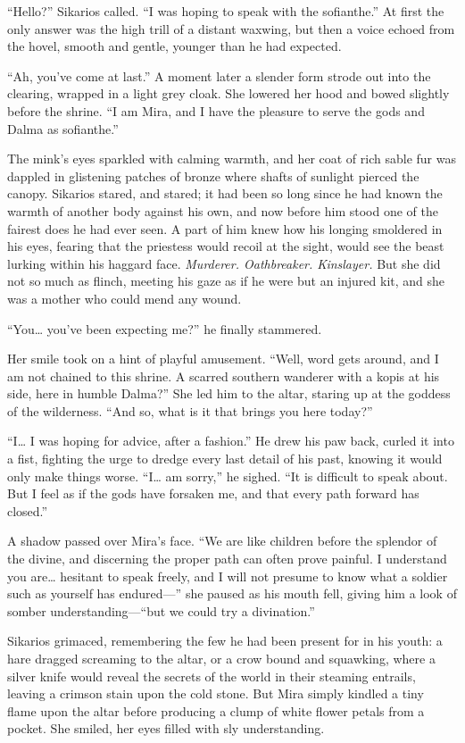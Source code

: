 ``Hello?'' Sikarios called. ``I was hoping to speak with the sofianthe.'' At first the only answer was the high trill of a distant waxwing, but then a voice echoed from the hovel, smooth and gentle, younger than he had expected.

``Ah, you've come at last.'' A moment later a slender form strode out into the clearing, wrapped in a light grey cloak. She lowered her hood and bowed slightly before the shrine. ``I am Mira, and I have the pleasure to serve the gods and Dalma as sofianthe.''

The mink's eyes sparkled with calming warmth, and her coat of rich sable fur was dappled in glistening patches of bronze where shafts of sunlight pierced the canopy. Sikarios stared, and stared; it had been so long since he had known the warmth of another body against his own, and now before him stood one of the fairest does he had ever seen. A part of him knew how his longing smoldered in his eyes, fearing that the priestess would recoil at the sight, would see the beast lurking within his haggard face. \emph{Murderer. Oathbreaker. Kinslayer.} But she did not so much as flinch, meeting his gaze as if he were but an injured kit, and she was a mother who could mend any wound.

``You\ldots{} you've been expecting me?'' he finally stammered.

Her smile took on a hint of playful amusement. ``Well, word gets around, and I am not chained to this shrine. A scarred southern wanderer with a kopis at his side, here in humble Dalma?'' She led him to the altar, staring up at the goddess of the wilderness. ``And so, what is it that brings you here today?''

``I\ldots{} I was hoping for advice, after a fashion.'' He drew his paw back, curled it into a fist, fighting the urge to dredge every last detail of his past, knowing it would only make things worse. ``I\ldots{} am sorry,'' he sighed. ``It is difficult to speak about. But I feel as if the gods have forsaken me, and that every path forward has closed.''

A shadow passed over Mira's face. ``We are like children before the splendor of the divine, and discerning the proper path can often prove painful. I understand you are\ldots{} hesitant to speak freely, and I will not presume to know what a soldier such as yourself has endured---'' she paused as his mouth fell, giving him a look of somber understanding---``but we could try a divination.''

Sikarios grimaced, remembering the few he had been present for in his youth: a hare dragged screaming to the altar, or a crow bound and squawking, where a silver knife would reveal the secrets of the world in their steaming entrails, leaving a crimson stain upon the cold stone. But Mira simply kindled a tiny flame upon the altar before producing a clump of white flower petals from a pocket. She smiled, her eyes filled with sly understanding.

